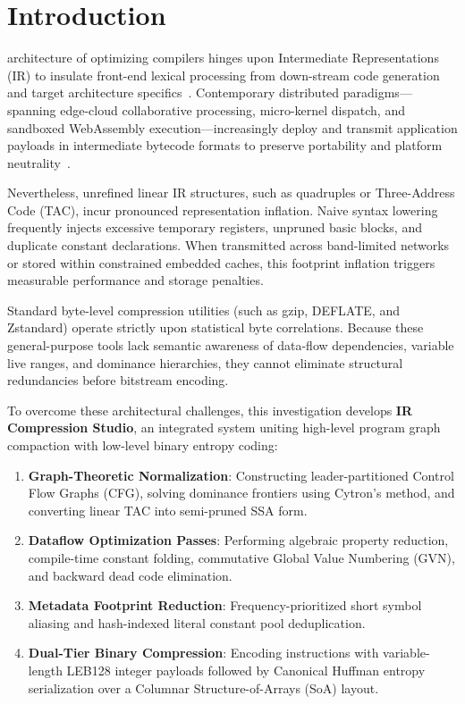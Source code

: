 \documentclass{ieeeaccess}
\newcommand{\PARstart}[2]{\IEEEPARstart{#1}{#2}}
\begin{document}
\ifieeeaccess %
\titlepgskip<15pt>
\maketitle
\fi

\section{Introduction}
\label{sec:introduction} %
\PARstart{T}{he} architecture of optimizing compilers hinges upon Intermediate Representations (IR) to insulate front-end lexical processing from down-stream code generation and target architecture specifics~\cite{aho2006compilers}. Contemporary distributed paradigms—spanning edge-cloud collaborative processing, micro-kernel dispatch, and sandboxed WebAssembly execution—increasingly deploy and transmit application payloads in intermediate bytecode formats to preserve portability and platform neutrality~\cite{muchnick1997advanced}.

Nevertheless, unrefined linear IR structures, such as quadruples or Three-Address Code (TAC), incur pronounced representation inflation. Naive syntax lowering frequently injects excessive temporary registers, unpruned basic blocks, and duplicate constant declarations. When transmitted across band-limited networks or stored within constrained embedded caches, this footprint inflation triggers measurable performance and storage penalties.

Standard byte-level compression utilities (such as gzip, DEFLATE, and Zstandard) operate strictly upon statistical byte correlations. Because these general-purpose tools lack semantic awareness of data-flow dependencies, variable live ranges, and dominance hierarchies, they cannot eliminate structural redundancies before bitstream encoding.

To overcome these architectural challenges, this investigation develops \textbf{IR Compression Studio}, an integrated system uniting high-level program graph compaction with low-level binary entropy coding:
\begin{enumerate}
    \item \textbf{Graph-Theoretic Normalization}: Constructing leader-partitioned Control Flow Graphs (CFG), solving dominance frontiers using Cytron's method, and converting linear TAC into semi-pruned SSA form.
    \item \textbf{Dataflow Optimization Passes}: Performing algebraic property reduction, compile-time constant folding, commutative Global Value Numbering (GVN), and backward dead code elimination.
    \item \textbf{Metadata Footprint Reduction}: Frequency-prioritized short symbol aliasing and hash-indexed literal constant pool deduplication.
    \item \textbf{Dual-Tier Binary Compression}: Encoding instructions with variable-length LEB128 integer payloads followed by Canonical Huffman entropy serialization over a Columnar Structure-of-Arrays (SoA) layout.
\end{enumerate}
\end{document}
